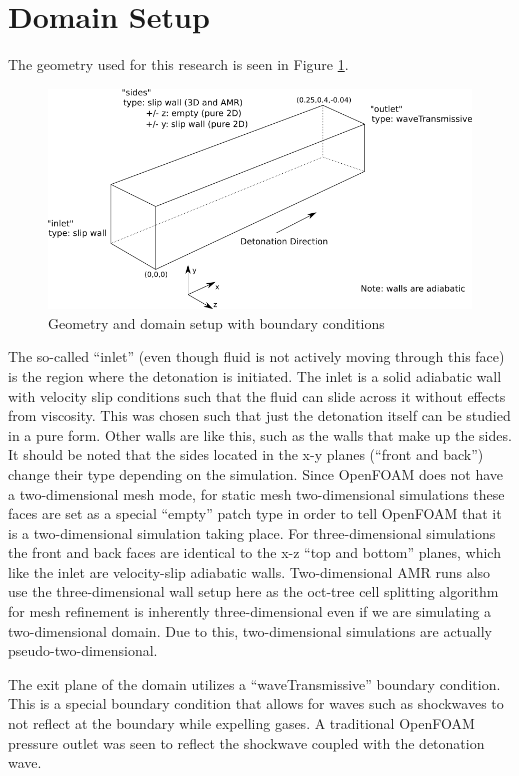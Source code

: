 \section{Domain Setup}
The geometry used for this research is seen in Figure \ref{fig:domainBC}.
\begin{figure}[H]
\centering
\includegraphics[width=\linewidth]{./figs/domainBC.png}
\caption{Geometry and domain setup with boundary conditions}
\label{fig:domainBC}
\end{figure}%
The so-called ``inlet'' (even though fluid is not actively moving through this face) is the region where the detonation is initiated. The inlet is a solid adiabatic wall with velocity slip conditions such that the fluid can slide across it without effects from viscosity. This was chosen such that just the detonation itself can be studied in a pure form. Other walls are like this, such as the walls that make up the sides. It should be noted that the sides located in the x-y planes (``front and back'') change their type depending on the simulation. Since OpenFOAM does not have a two-dimensional mesh mode, for static mesh two-dimensional simulations these faces are set as a special ``empty'' patch type in order to tell OpenFOAM that it is a two-dimensional simulation taking place. For three-dimensional simulations the front and back faces are identical to the x-z ``top and bottom'' planes, which like the inlet are velocity-slip adiabatic walls. Two-dimensional AMR runs also use the three-dimensional wall setup here as the oct-tree cell splitting algorithm for mesh refinement is inherently three-dimensional even if we are simulating a two-dimensional domain. Due to this, two-dimensional simulations are actually pseudo-two-dimensional. 

The exit plane of the domain utilizes a ``waveTransmissive'' boundary condition. This is a special boundary condition that allows for waves such as shockwaves to not reflect at the boundary while expelling gases. A traditional OpenFOAM pressure outlet was seen to reflect the shockwave coupled with the detonation wave. 



